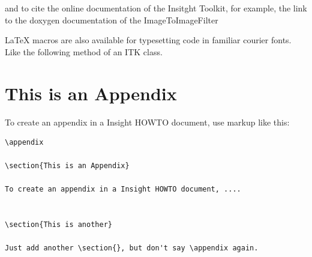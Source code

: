 \documentclass{InsightArticle}
\begin{document}
and to cite the online documentation of the Insitght Toolkit, for example, the
link to the doxygen documentation of the ImageToImageFilter


LaTeX macros are also available for typesetting code in familiar courier fonts.
Like the following method of an ITK class.







\appendix

\section{This is an Appendix}

To create an appendix in a Insight HOWTO document, use markup like
this:

\begin{verbatim}
\appendix

\section{This is an Appendix}

To create an appendix in a Insight HOWTO document, ....


\section{This is another}

Just add another \section{}, but don't say \appendix again.
\end{verbatim}


%
%
\end{document}
